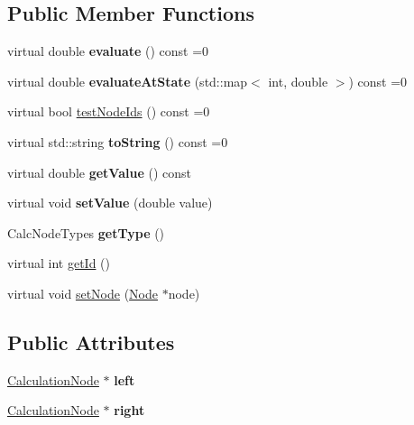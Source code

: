 \subsection*{Public Member Functions}
\begin{DoxyCompactItemize}
\item 
virtual double {\bfseries evaluate} () const  =0\hypertarget{classCalculationNode_ac0b4e69fc8bfc99b0ad178b4eeb15883}{}\label{classCalculationNode_ac0b4e69fc8bfc99b0ad178b4eeb15883}

\item 
virtual double {\bfseries evaluate\+At\+State} (std\+::map$<$ int, double $>$) const  =0\hypertarget{classCalculationNode_a15efb576650532bbf21a11f1f9bcb1b2}{}\label{classCalculationNode_a15efb576650532bbf21a11f1f9bcb1b2}

\item 
virtual bool \hyperlink{classCalculationNode_a4089a2510d7c345a9632843a3fed4f0e}{test\+Node\+Ids} () const  =0
\item 
virtual std\+::string {\bfseries to\+String} () const  =0\hypertarget{classCalculationNode_aeee8e0d2c7d5c97e0d6801e9644cd686}{}\label{classCalculationNode_aeee8e0d2c7d5c97e0d6801e9644cd686}

\item 
virtual double {\bfseries get\+Value} () const \hypertarget{classCalculationNode_af23ecff57877120eea2f402bb8432549}{}\label{classCalculationNode_af23ecff57877120eea2f402bb8432549}

\item 
virtual void {\bfseries set\+Value} (double value)\hypertarget{classCalculationNode_a63783e44f06e8b665f2f6851616b2965}{}\label{classCalculationNode_a63783e44f06e8b665f2f6851616b2965}

\item 
Calc\+Node\+Types {\bfseries get\+Type} ()\hypertarget{classCalculationNode_ad5df05ec0725d5c4c44b6eecc158a83b}{}\label{classCalculationNode_ad5df05ec0725d5c4c44b6eecc158a83b}

\item 
virtual int \hyperlink{classCalculationNode_a57d514437cfc918ddb298d482358c82d}{get\+Id} ()
\item 
virtual void \hyperlink{classCalculationNode_a4097a8577ad76d94c32250d76988353c}{set\+Node} (\hyperlink{classNode}{Node} $\ast$node)
\end{DoxyCompactItemize}
\subsection*{Public Attributes}
\begin{DoxyCompactItemize}
\item 
\hyperlink{classCalculationNode}{Calculation\+Node} $\ast$ {\bfseries left}\hypertarget{classCalculationNode_ae82c63d4efc74c0b11a00cc06f225629}{}\label{classCalculationNode_ae82c63d4efc74c0b11a00cc06f225629}

\item 
\hyperlink{classCalculationNode}{Calculation\+Node} $\ast$ {\bfseries right}\hypertarget{classCalculationNode_a55560a0b8fa37b8443c908a06d08f087}{}\label{classCalculationNode_a55560a0b8fa37b8443c908a06d08f087}

\end{DoxyCompactItemize}
